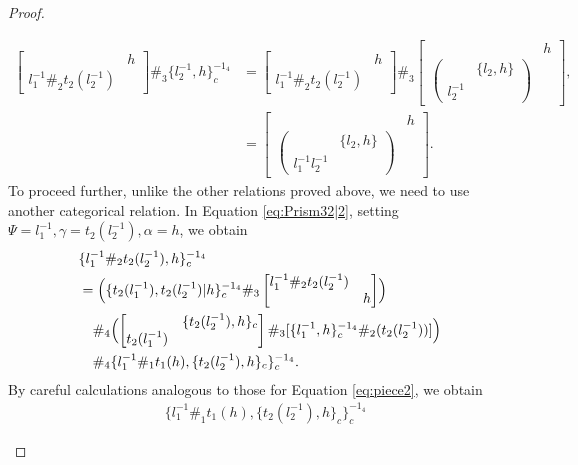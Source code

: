 \documentclass[11pt, reqno]{amsart} %
\theoremstyle{definition}
\theoremstyle{remark}
\numberwithin{equation}{section}
\begin{document}
\begin{proof}
\begin{enumerate}
\begin{align}
    \nonumber
    \begin{bmatrix}& h \\ l_1^{-1}\#_2t_2(l_2^{-1}) &\end{bmatrix}
    \#_3
    \{l_2^{-1},h\}_c^{-1_4}
    &= 
    \begin{bmatrix}& h \\ l_1^{-1}\#_2t_2(l_2^{-1}) &\end{bmatrix}
    \#_3
    \begin{bmatrix} & h\\ \begin{pmatrix} & \{l_2,h\} \\ l_2^{-1} & \end{pmatrix} & \end{bmatrix}, \\
    \label{eq:piece2}
    &= \begin{bmatrix} & h\\ \begin{pmatrix} & \{l_2,h\} \\ l_1^{-1}l_2^{-1} & \end{pmatrix} & \end{bmatrix}.
  \end{align}
  To proceed further, unlike the other relations proved above, we need to use another categorical relation. In Equation \eqref{eq:Prism32|2}, setting $\Psi = l_1^{-1},\gamma = t_2(l_2^{-1}),\alpha=h$, we obtain
  \begin{align*}
    &
    \{l_1^{-1}\#_2t_2(l_2^{-1}),h\}_c^{-1_4} \\
    &= 
    \Bigl(
      \{t_2(l_1^{-1}),t_2(l_2^{-1})|h\}_c^{-1_4}
      \#_3
      \begin{bmatrix}l_1^{-1}\#_2t_2(l_2^{-1}) & \\ & h\end{bmatrix}
    \Bigr) \\
    &\quad \#_4
    \Bigl(
      \begin{bmatrix} & \{t_2(l_2^{-1}),h\}_c \\ t_2(l_1^{-1}) & \end{bmatrix}
      \#_3
      [\{l_1^{-1},h\}_c^{-1_4}\#_2(t_2(l_2^{-1}))]
    \Bigr) \\
    &\quad \#_4
    \{l_1^{-1}\#_1t_1(h),\{t_2(l_2^{-1}),h\}_c\}_c^{-1_4}.
  \end{align*}
  By careful calculations analogous to those for Equation \eqref{eq:piece2}, we obtain
  \begin{align}
    &
    \nonumber
    \{l_1^{-1}\#_1t_1(h),\{t_2(l_2^{-1}),h\}_c\}_c^{-1_4}

\end{align}
\end{enumerate}
\end{proof}
\end{document}
